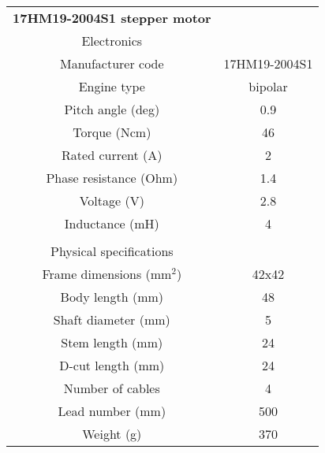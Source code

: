 \begin{minipage}{0.5\textwidth}
    \centering
    \begin{tabular}{cc}
        \textbf{17HM19-2004S1 stepper motor}&\\
        Electronics&\\
        \hline
        Manufacturer code & 17HM19-2004S1\\
        Engine type & bipolar\\
        Pitch angle (deg) & 0.9 \\
        Torque (Ncm)& 46\\
        Rated current (A) & 2\\
        Phase resistance (Ohm)& 1.4\\
        Voltage (V)& 2.8\\
        Inductance (mH)& 4\\
         & \\
        Physical specifications&\\
        \hline
        Frame dimensions (mm\(^2\))& 42x42 \\
        Body length (mm)& 48 \\
        Shaft diameter (mm)& 5 \\
        Stem length (mm)& 24 \\
        D-cut length (mm)& 24 \\
        Number of cables & 4\\
        Lead number (mm)& 500 \\
        Weight (g) & 370\\
        \hline
    \end{tabular}
    \label{tab:nema_17_specifics_2}
\end{minipage}

